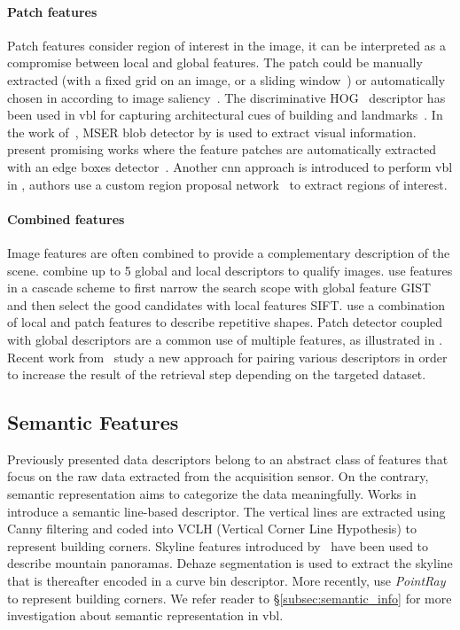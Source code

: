 		\paragraph{Patch features}
			Patch features consider region of interest in the image, it can be interpreted as a compromise between local and global features. The patch could be manually extracted (with a fixed grid on an image, or a sliding window~\citep{Dalal2005}) or automatically chosen in according to image saliency~\citep{Matas2004}. The discriminative HOG~\citep{Dalal2005} descriptor has been used in \ac{vbl} for capturing architectural cues of building and landmarks~\citep{Shrivastava2011, Aubry2014, McManus2014,Morago2016}. In the work of~\citep{Nister2006,Kim2015}, MSER blob detector by \citet{Matas2004} is used to extract visual information. \citet{Sunderhauf2015a} present promising works where the feature patches are automatically extracted with an edge boxes detector~\citep{Zitnick2014}. Another \ac{cnn} approach is introduced to perform \ac{vbl} in \citep{Gordo2016}, authors use a custom region proposal network~\citep{Ren2015} to extract regions of interest.
			
		\paragraph{Combined features}
			Image features are often combined to provide a complementary description of the scene. \citet{Hays2008} combine up to 5 global and local descriptors to qualify images. \citet{Azzi2016} use features in a cascade scheme to first narrow the search scope with global feature GIST and then select the good candidates with local features SIFT. \citet{Morago2016} use a combination of local and patch features to describe repetitive shapes. Patch detector coupled with global descriptors are a common use of multiple features, as illustrated in \citep{Kim2015,Gordo2016,Sunderhauf2015a,Yan2016}. Recent work from~\citet{Bhowmik2017} study a new approach for pairing various descriptors in order to increase the result of the retrieval step depending on the targeted dataset.
						
	\subsection{Semantic Features}		
	\label{subsec:semantic_representation}
		Previously presented data descriptors belong to an abstract class of features that focus on the raw data extracted from the acquisition sensor. On the contrary, semantic representation aims to categorize the data meaningfully. Works in~\citep{Cham2010} introduce a semantic line-based descriptor. The vertical lines are extracted using Canny filtering and coded into VCLH (Vertical Corner Line Hypothesis) to represent building corners. Skyline features introduced by~\citet{Baatz2012} have been used to describe mountain panoramas. Dehaze segmentation is used to extract the skyline that is thereafter encoded in a curve bin descriptor. More recently, \citet{Bansal2014} use \textit{PointRay} to represent building corners. We refer reader to \S\ref{subsec:semantic_info} for more investigation about semantic representation in \ac{vbl}.